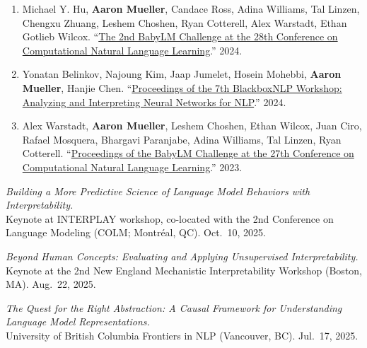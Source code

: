 \documentclass[10pt]{article}
\renewcommand{\section}[1]{\pagebreak[3]%
	\vspace{0.5\baselineskip}%
	\phantomsection\addcontentsline{toc}{section}{#1}%
	\noindent\llap{\bf\scshape\smash{\parbox[t]{\marginparwidth}{\hyphenpenalty=10000\raggedright \textcolor{black}{#1}}}}%
	\vspace{-\baselineskip}\par}
\newcommand{\halfblankline}{\quad\vspace{-0.5\baselineskip}\pagebreak[3]}
\providecommand*\titlelink[2]{\href{#1}{\textcolor{accent}{#2}}}
\begin{document}
	\begin{enumerate}[leftmargin=*, topsep=0pt, itemsep=0.25ex, partopsep=0ex, parsep=1ex, label=EW\arabic*., ref=EW\arabic*]
	
	\item Michael Y. Hu, \textbf{Aaron Mueller}, Candace Ross, Adina Williams, Tal Linzen, Chengxu Zhuang, Leshem Choshen, Ryan Cotterell, Alex Warstadt, Ethan Gotlieb Wilcox. ``\titlelink{https://aclanthology.org/2024.conll-babylm.0/}{The 2nd BabyLM Challenge at the 28th Conference on Computational Natural Language Learning}.'' 2024.
	
	\item Yonatan Belinkov, Najoung Kim, Jaap Jumelet, Hosein Mohebbi, \textbf{Aaron Mueller}, Hanjie Chen. ``\titlelink{https://aclanthology.org/2024.blackboxnlp-1.0/}{Proceedings of the 7th BlackboxNLP Workshop: Analyzing and Interpreting Neural Networks for NLP}.'' 2024.
	
	\item Alex Warstadt, \textbf{Aaron Mueller}, Leshem Choshen, Ethan Wilcox, Juan Ciro, Rafael Mosquera, Bhargavi Paranjabe, Adina Williams, Tal Linzen, Ryan Cotterell. ``\titlelink{https://aclanthology.org/volumes/2023.conll-babylm/}{Proceedings of the BabyLM Challenge at the 27th Conference on Computational Natural Language Learning}.'' 2023.

	\end{enumerate}

	\halfblankline
	


	\section{Invited\\Talks and\\Panels}
	\emph{Building a More Predictive Science of Language Model Behaviors with Interpretability.}\\
	Keynote at INTERPLAY workshop, co-located with the 2nd Conference on Language Modeling (COLM; Montréal, QC). Oct.\ 10, 2025.
		
	\halfblankline

	\emph{Beyond Human Concepts: Evaluating and Applying Unsupervised Interpretability.}\\
	Keynote at the 2nd New England Mechanistic Interpretability Workshop (Boston, MA). Aug.\ 22, 2025.

	\halfblankline
	
	\emph{The Quest for the Right Abstraction: A Causal Framework for Understanding Language Model Representations.}\\
	University of British Columbia Frontiers in NLP (Vancouver, BC). Jul.\ 17, 2025.
	
\end{document}
